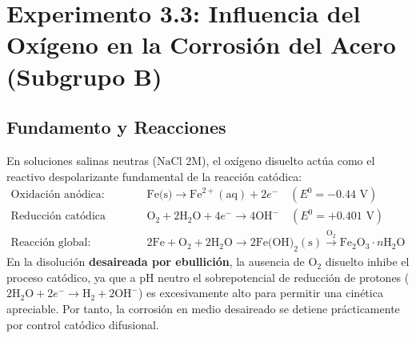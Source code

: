 \documentclass[11pt,a4paper]{article}
\begin{document}
\section{Experimento 3.3: Influencia del Oxígeno en la Corrosión del Acero (Subgrupo B)}
\subsection{Fundamento y Reacciones}
En soluciones salinas neutras ($\text{NaCl}$ 2M), el oxígeno disuelto actúa como el reactivo despolarizante fundamental de la reacción catódica:
\begin{align}
    \text{Oxidación anódica:} \quad & \text{Fe(s)} \longrightarrow \text{Fe}^{2+}(\text{aq}) + 2e^- \quad (E^0 = -0.44\text{ V}) \\
    \text{Reducción catódica (Aireada):} \quad & \text{O}_2 + 2\text{H}_2\text{O} + 4e^- \longrightarrow 4\text{OH}^- \quad (E^0 = +0.401\text{ V}) \\
    \text{Reacción global:} \quad & 2\text{Fe} + \text{O}_2 + 2\text{H}_2\text{O} \longrightarrow 2\text{Fe(OH)}_2(\text{s}) \xrightarrow{\text{O}_2} \text{Fe}_2\text{O}_3\cdot n\text{H}_2\text{O}
\end{align}
En la disolución \textbf{desaireada por ebullición}, la ausencia de $\text{O}_2$ disuelto inhibe el proceso catódico, ya que a pH neutro el sobrepotencial de reducción de protones ($2\text{H}_2\text{O} + 2e^- \rightarrow \text{H}_2 + 2\text{OH}^-$) es excesivamente alto para permitir una cinética apreciable. Por tanto, la corrosión en medio desaireado se detiene prácticamente por control catódico difusional.
\end{document}
